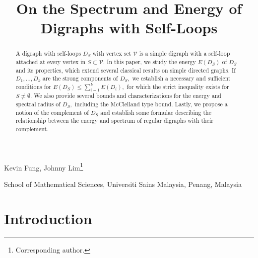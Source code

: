 \documentclass[12pt,a4paper,reqno]{amsart}
\title[]{On the Spectrum and Energy of  \\ Digraphs with Self-Loops}
\makeatletter
\numberwithin{equation}{section}
\theoremstyle{plain}
\theoremstyle{definition}
\newcommand{\<}{\langle}
\renewcommand{\>}{\rangle}
\newcommand{\cV}{{\mathcal V}}
\renewcommand{\thefootnote}{\fnsymbol{footnote}}
\newcommand{\authorfootnotes}{\renewcommand\thefootnote{\@fnsymbol\c@footnote}}%
\makeatother
\begin{document}
\begin{center}
    \vspace{-1cm}
	\maketitle
	
	\normalsize
    \authorfootnotes
    Kevin Fung, Johnny Lim\footnote[1]{Corresponding author.}%
	\par \bigskip



        \small{School of Mathematical Sciences, Universiti Sains Malaysia, Penang, Malaysia}\par \bigskip

\end{center}

\address{School of Mathematical Sciences, Universiti Sains Malaysia, Penang, Malaysia
}

\begin{abstract}
A digraph with self-loops $D_S$ with vertex set $\cV$ is a simple digraph with a self-loop attached at every vertex in $S\subset \cV.$
In this paper, we study the energy $E(D_S)$ of $D_S$ and its properties, which extend several classical results on simple directed graphs. If $D_1,...,D_k$ are the strong components of $D_S,$ we establish a necessary and sufficient conditions for $E(D_S) \leq \sum^k_{i=1} E(D_i),$ for which the strict inequality exists for $S\neq \emptyset.$ We also provide several bounds and characterizations for the energy and spectral radius of $D_S,$ including the McClelland type bound. Lastly, we propose a notion of the complement of $D_S$ and establish some formulae describing the relationship between the energy and spectrum of regular digraphs with their complement.
\end{abstract}

\section{Introduction}
\label{sec1}
\end{document}
